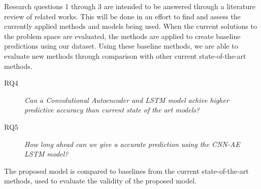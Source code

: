 Research questions 1 through 3 are intended to be answered through a literature review of related works.
This will be done in an effort to find and assess the currently applied methods and models being used.
When the current solutions to the problem space are evaluated,
the methods are applied to create baseline predictions using our dataset.
Using these baseline methods, we are able to evaluate new methods through comparison with other current state-of-the-art methods.

\begin{description}
    \item[RQ4]{\it Can a Convolutional Autoencoder and LSTM model achive higher predictive accuracy than current state of the art models?}
\end{description}

\begin{description}
    \item[RQ5]{\it How long ahead can we give a accurate prediction using the CNN-AE LSTM model?}
\end{description}

The proposed model is compared to baselines from the current state-of-the-art methods, used to evaluate the validity of the proposed model.



\iffalse

We have aditional research questions defined in notion regarding comparison between the CNN-AE LSTM and the ARIMA model,
but this is essentially covered trough RQ4.

Additionaly, we have a research question focusing on anomaly prediction.
Anomalies are going to be dificult to predict with a CNN-AE LSTM as the CNN-AE part of the model is used to reduce the noise,
and thus make it easier to predict the overal interest development for products. (Or so we hope!)

Regardless of this, the CNN-AE does serve as a powerfull anomaly detector, as the AE is able to predict what a "normal" value should be,
thus giving us information regarding weither or not the values are withing this margin.

\fi
